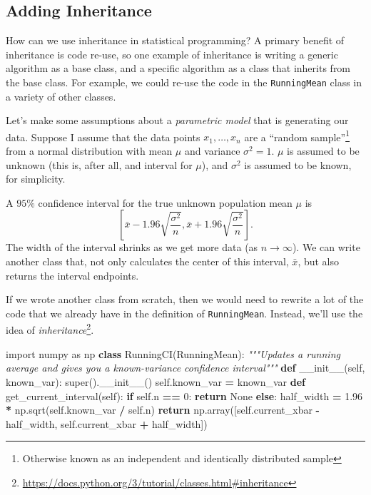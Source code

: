 \documentclass[
  12pt,
]{krantz}
\makeatletter
\newenvironment{Shaded}{\begin{snugshade}}{\end{snugshade}}
\newcommand{\BuiltInTok}[1]{#1}
\newcommand{\CommentTok}[1]{\textcolor[rgb]{0.37,0.37,0.37}{\textit{#1}}}
\newcommand{\ControlFlowTok}[1]{\textcolor[rgb]{0.27,0.27,0.27}{\textbf{#1}}}
\newcommand{\DecValTok}[1]{\textcolor[rgb]{0.06,0.06,0.06}{#1}}
\newcommand{\FloatTok}[1]{\textcolor[rgb]{0.06,0.06,0.06}{#1}}
\newcommand{\FunctionTok}[1]{\textcolor[rgb]{0,0,0}{#1}}
\newcommand{\ImportTok}[1]{#1}
\newcommand{\KeywordTok}[1]{\textcolor[rgb]{0.27,0.27,0.27}{\textbf{#1}}}
\newcommand{\NormalTok}[1]{#1}
\newcommand{\OperatorTok}[1]{\textcolor[rgb]{0.43,0.43,0.43}{\textbf{#1}}}
\newcommand{\VariableTok}[1]{\textcolor[rgb]{0,0,0}{#1}}
\renewcommand{\href}[2]{#2\footnote{\url{#1}}}
\newenvironment{kframe}{%
\medskip{}
\setlength{\fboxsep}{.8em}
 \def\at@end@of@kframe{}%
 \ifinner\ifhmode%
  \def\at@end@of@kframe{\end{minipage}}%
  \begin{minipage}{\columnwidth}%
 \fi\fi%
 \def\FrameCommand##1{\hskip\@totalleftmargin \hskip-\fboxsep
 \colorbox{shadecolor}{##1}\hskip-\fboxsep
     \hskip-\linewidth \hskip-\@totalleftmargin \hskip\columnwidth}%
 \MakeFramed {\advance\hsize-\width
   \@totalleftmargin\z@ \linewidth\hsize
   \@setminipage}}%
 {\par\unskip\endMakeFramed%
 \at@end@of@kframe}
\renewenvironment{Shaded}{\begin{kframe}}{\end{kframe}}
\makeatother
\begin{document}
\hypertarget{adding-inheritance}{%
\subsection{Adding Inheritance}\label{adding-inheritance}}

How can we use inheritance in statistical programming? A primary benefit of inheritance is code re-use, so one example of inheritance is writing a generic algorithm as a base class, and a specific algorithm as a class that inherits from the base class. For example, we could re-use the code in the \texttt{RunningMean} class in a variety of other classes.

Let's make some assumptions about a \emph{parametric model} that is generating our data. Suppose I assume that the data points \(x_1, \ldots, x_n\) are a ``random sample''\footnote{Otherwise known as an independent and identically distributed sample} from a normal distribution with mean \(\mu\) and variance \(\sigma^2=1\). \(\mu\) is assumed to be unknown (this is, after all, and interval for \(\mu\)), and \(\sigma^2\) is assumed to be known, for simplicity.

A \(95\%\) confidence interval for the true unknown population mean \(\mu\) is
\[
\left[\bar{x} - 1.96 \sqrt{\frac{\sigma^2}{n}}, \bar{x} + 1.96 \sqrt{\frac{\sigma^2}{n}} \right].
\]
The width of the interval shrinks as we get more data (as \(n \to \infty\)). We can write another class that, not only calculates the center of this interval, \(\bar{x}\), but also returns the interval endpoints.

If we wrote another class from scratch, then we would need to rewrite a lot of the code that we already have in the definition of \texttt{RunningMean}. Instead, we'll use the idea of \href{https://docs.python.org/3/tutorial/classes.html\#inheritance}{\emph{inheritance}}.

\begin{Shaded}
\begin{Highlighting}[]
\ImportTok{import}\NormalTok{ numpy }\ImportTok{as}\NormalTok{ np}
\KeywordTok{class}\NormalTok{ RunningCI(RunningMean):}
  \CommentTok{"""Updates a running average and gives you a known{-}variance confidence interval"""}
  \KeywordTok{def} \FunctionTok{\_\_init\_\_}\NormalTok{(}\VariableTok{self}\NormalTok{, known\_var):}
    \BuiltInTok{super}\NormalTok{().}\FunctionTok{\_\_init\_\_}\NormalTok{()}
    \VariableTok{self}\NormalTok{.known\_var }\OperatorTok{=}\NormalTok{ known\_var}
  \KeywordTok{def}\NormalTok{ get\_current\_interval(}\VariableTok{self}\NormalTok{):}
    \ControlFlowTok{if} \VariableTok{self}\NormalTok{.n }\OperatorTok{==} \DecValTok{0}\NormalTok{:}
      \ControlFlowTok{return} \VariableTok{None}
    \ControlFlowTok{else}\NormalTok{:}
\NormalTok{      half\_width }\OperatorTok{=} \FloatTok{1.96} \OperatorTok{*}\NormalTok{ np.sqrt(}\VariableTok{self}\NormalTok{.known\_var }\OperatorTok{/} \VariableTok{self}\NormalTok{.n)  }
      \ControlFlowTok{return}\NormalTok{ np.array([}\VariableTok{self}\NormalTok{.current\_xbar }\OperatorTok{{-}}\NormalTok{ half\_width, }\VariableTok{self}\NormalTok{.current\_xbar }\OperatorTok{+}\NormalTok{ half\_width])}
\end{Highlighting}
\end{Shaded}
\end{document}
